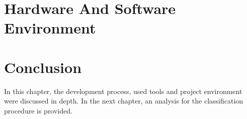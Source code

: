 \section{Hardware And Software Environment}

\section{Conclusion}
In this chapter, the development process, used tools and project environment were discussed in depth. In the next chapter, an analysis for the classification procedure is provided.

